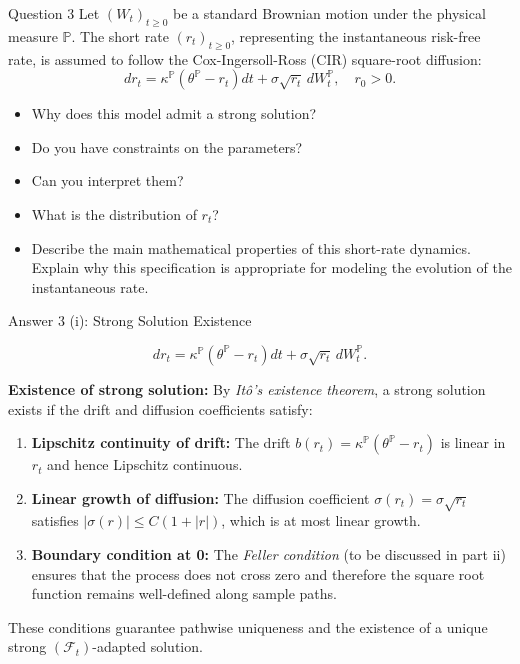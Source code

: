 \documentclass[compress]{beamer}
\begin{document}
\begin{frame}{Question 3}
    Let $(W_t)_{t \geq 0}$ be a standard Brownian motion under the physical measure $\mathbb{P}$. The short rate $(r_t)_{t \geq 0}$, representing the instantaneous risk-free rate, is assumed to follow the Cox-Ingersoll-Ross (CIR) square-root diffusion:
    \[
        dr_t = \kappa^{\mathbb{P}}\left(\theta^{\mathbb{P}} - r_t\right)dt + \sigma\sqrt{r_t}\,dW_t^{\mathbb{P}}, \quad r_0 > 0.
    \]
    \begin{itemize}
        \item[(i)] Why does this model admit a strong solution?
        \item[(ii)] Do you have constraints on the parameters?
        \item[(iii)] Can you interpret them?
        \item[(iv)] What is the distribution of $r_t$?
        \item[(v)] Describe the main mathematical properties of this short-rate dynamics. Explain why this specification is appropriate for modeling the evolution of the instantaneous rate.
    \end{itemize}
\end{frame}

\begin{frame}[allowframebreaks]{Answer 3 (i): Strong Solution Existence}
    \small
    
    \[
        dr_t = \kappa^{\mathbb{P}}(\theta^{\mathbb{P}} - r_t)dt + \sigma\sqrt{r_t}\,dW_t^{\mathbb{P}}.
    \]
    
    \vspace{1em}
    
    \textbf{Existence of strong solution:} By \textit{Itô's existence theorem}, a strong solution exists if the drift and diffusion coefficients satisfy:
    
    \vspace{0.5em}
    
    \begin{enumerate}
        \item \textbf{Lipschitz continuity of drift:} The drift $b(r_t) = \kappa^{\mathbb{P}}(\theta^{\mathbb{P}} - r_t)$ is linear in $r_t$ and hence Lipschitz continuous.
        
        \item \textbf{Linear growth of diffusion:} The diffusion coefficient $\sigma(r_t) = \sigma\sqrt{r_t}$ satisfies $|\sigma(r)| \leq C(1 + |r|)$, which is at most linear growth.
        
        \item \textbf{Boundary condition at 0:} The \textit{Feller condition} (to be discussed in part ii) ensures that the process does not cross zero and therefore the square root function remains well-defined along sample paths.
    \end{enumerate}
    
    \vspace{1em}
    
    These conditions guarantee pathwise uniqueness and the existence of a unique strong $(\mathcal{F}_t)$-adapted solution.
\end{frame}
\end{document}
